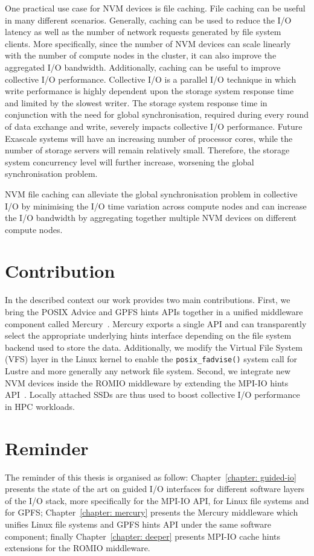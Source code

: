 One practical use case for NVM devices is file caching. File caching can be useful in many different scenarios. Generally, caching can be used to reduce the I/O latency as well as the number of network requests 
generated by file system clients. More specifically, since the number of NVM devices can scale linearly with the number of compute nodes in the cluster, it can also improve the aggregated I/O bandwidth. Additionally, 
caching can be useful to improve collective I/O performance. Collective I/O is a parallel I/O technique in which write performance is highly dependent upon the storage system response time and limited by the slowest writer. 
The storage system response time in conjunction with the need for global synchronisation, required during every round of data exchange and write, severely impacts collective I/O performance. Future Exascale systems will have 
an increasing number of processor cores, while the number of storage servers will remain relatively small. Therefore, the storage system concurrency level will further increase, worsening the global synchronisation problem.

NVM file caching can alleviate the global synchronisation problem in collective I/O by minimising the I/O time variation across compute nodes and can increase the I/O bandwidth by aggregating together multiple NVM devices on different compute nodes.

\section{Contribution} \label{sec: contribution}
In the described context our work provides two main contributions. First, we bring the POSIX Advice and GPFS hints APIs together in a unified middleware component called Mercury~\cite{CongiuGPMSB}. Mercury exports a single API and can transparently select the appropriate underlying hints interface depending on the file system backend used to store the data. Additionally, we modify the Virtual File System (VFS) layer in the Linux kernel to enable the \texttt{posix\_fadvise()} system call for Lustre and more generally any network file system. Second, we integrate new NVM devices inside the ROMIO middleware by extending the MPI-IO hints API~\cite{CongiuNSB}. Locally attached SSDs are thus used to boost collective I/O performance in HPC workloads.

\section{Reminder}
The reminder of this thesis is organised as follow: Chapter~\ref{chapter: guided-io} presents the state of the art on guided I/O interfaces for different software layers of the I/O stack, more specifically for the MPI-IO API, for Linux file systems and for GPFS; Chapter~\ref{chapter: mercury} presents the Mercury middleware which unifies Linux file systems and GPFS hints API under the same software component; finally Chapter~\ref{chapter: deeper} presents MPI-IO cache hints extensions for the ROMIO middleware. 
